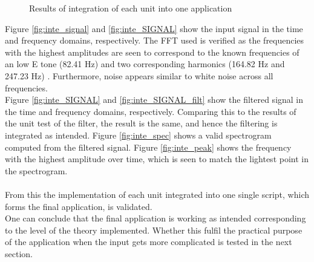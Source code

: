 \begin{figure}[H]
\begin{subfigure}{0.49\textwidth}
\end{subfigure}
\caption{Results of integration of each unit into one application }
\label{fig:inte_validation}
\end{figure}
Figure \ref{fig:inte_signal} and \ref{fig:inte_SIGNAL} show the input signal in the time and frequency domains, respectively. The FFT used is verified as the frequencies with the highest amplitudes are seen to correspond to the known frequencies of an low E tone (82.41 Hz) and two corresponding harmonics (164.82 Hz and 247.23 Hz) . Furthermore, noise appears similar to white noise across all frequencies.\\
Figure \ref{fig:inte_SIGNAL} and \ref{fig:inte_SIGNAL_filt} show the filtered signal in the time and frequency domains, respectively. Comparing this to the results of the unit test of the filter, the result is the same, and hence the filtering is integrated as intended. Figure \ref{fig:inte_spec} shows a valid spectrogram computed from the filtered signal. Figure \ref{fig:inte_peak} shows the frequency with the highest amplitude over time, which is seen to match the lightest point in the spectrogram. \\
\\
From this the implementation of each unit integrated into one single script, which forms the final application, is validated. \\
One can conclude that the final application is working as intended corresponding to the level of the theory implemented. Whether this fulfil the practical purpose of the application when the input gets more complicated is tested in the next section.